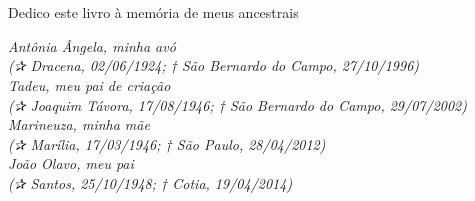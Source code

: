 
\chapter*{}

\vspace*{\fill}

\begin{minipage}[c]{1\textwidth}

\raggedleft

\scriptsize Dedico este livro à memória de meus ancestrais

\bigskip
\emph{Antônia Ângela, minha avó\\
(✰ Dracena, 02/06/1924; † São Bernardo do Campo, 27/10/1996)\\
\medskip
Tadeu, meu pai de criação\\
(✰ Joaquim Távora, 17/08/1946; † São Bernardo do Campo, 29/07/2002)\\
\medskip
Marineuza, minha mãe\\
(✰ Marília, 17/03/1946; † São Paulo, 28/04/2012)\\
\medskip
João Olavo, meu pai\\
(✰ Santos, 25/10/1948; † Cotia, 19/04/2014)}
\end{minipage}

\thispagestyle{empty}
